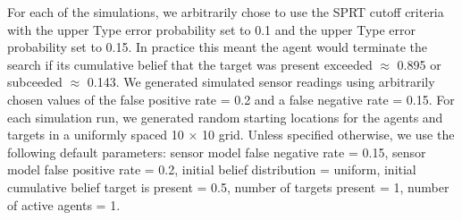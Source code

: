 \par For each of the simulations, we arbitrarily chose to use the SPRT cutoff criteria with the upper Type  error probability set to 0.1 and the upper Type  error probability set to 0.15. In practice this meant the agent would terminate the search if its cumulative belief that the target was present exceeded $\approx$ 0.895 or subceeded $\approx$ 0.143. We generated simulated sensor readings using arbitrarily chosen values of the false positive rate = 0.2 and a false negative rate = 0.15. For each simulation run, we generated random starting locations for the agents and targets in a uniformly spaced 10 $\times$ 10 grid. Unless specified otherwise, we use the following default parameters: sensor model false negative rate = 0.15, sensor model false positive rate = 0.2, initial belief distribution = uniform, initial cumulative belief target is present = 0.5, number of targets present = 1, number of active agents = 1.





